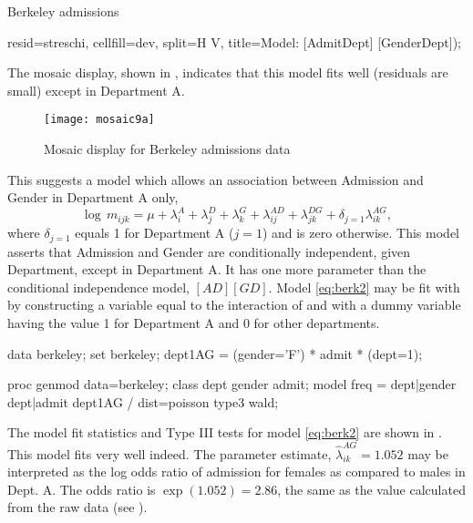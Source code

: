 \begin{Example}[berkeley6]{Berkeley admissions}
\begin{listing}
   resid=streschi, cellfill=dev, split=H V,
   title=Model: [AdmitDept] [GenderDept]);
\end{listing}
The mosaic display, shown in , indicates that this model fits well
(residuals are small)
except in Department A.
\begin{figure}[htb]
  \centering
  \texttt{[image: mosaic9a]}
  \caption{Mosaic display for Berkeley admissions data}%
  \label{fig:mosaic9a}
\end{figure}
This suggests a model which allows an association between Admission and Gender in Department
A only,
\begin{equation}\label{eq:berk2}
  \log \,  m_{ijk}  =
  \mu
  +  \lambda_i^A
  +  \lambda_j^D
  +  \lambda_k^G
  +  \lambda_{ij}^{AD}
  +  \lambda_{jk}^{DG}
  +  \delta_{j=1} \lambda_{ik}^{AG} \comma
\end{equation}
where $\delta_{j=1}$ equals 1 for Department A ($j=1$) and is zero otherwise.
This model asserts that Admission and Gender are conditionally independent,
given Department, except in Department A.  It has one more parameter than
the conditional independence model, $[AD] [GD]$.
Model \eqref{eq:berk2} may be fit with  by constructing a variable
equal to the interaction of  and 
with a dummy variable having the value 1 for Department A and 0 for other departments.
\begin{listing}
data berkeley;
   set berkeley;
   dept1AG = (gender='F') * admit * (dept=1);

proc genmod data=berkeley;
   class dept gender admit;
   model freq = dept|gender dept|admit dept1AG / dist=poisson type3 wald;
\end{listing}
The model fit statistics and Type III tests for model \eqref{eq:berk2} are shown in
.  This model fits very well indeed.
The parameter estimate, $\widehat{\lambda}_{ik}^{AG} = 1.052$ may be interpreted as
the log odds ratio of admission for females as compared to males in Dept. A.
The odds ratio is $\exp(1.052) = 2.86$, the same as the value calculated from the
raw data (see ).
\begin{Output}[htb]
\caption{Berkeley admissions data: Model \eqref{eq:berk2}, fit with }\label{out:genberk2.2}
\small

\end{Output}
\end{Example}

